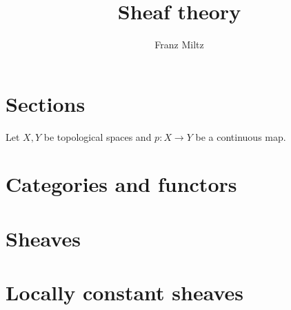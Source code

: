 \documentclass{article}
\author{Franz Miltz}
\title{Sheaf theory}
\begin{document}
\maketitle
\tableofcontents
\pagebreak

\printbibliography

\section{Sections}\label{sec:sections}

\begin{definition}
  Let $X,Y$ be topological spaces and $p:X\to Y$ be a continuous map.
\end{definition}

\missingexample

\section{Categories and functors}\label{sec:categories_and_functors}

\begin{definition}[Category]\label{def:category}
  \missingdef
\end{definition}

\begin{definition}[Functor]\label{def:functor}
  \missingdef
\end{definition}

\section{Sheaves}\label{sec:sheaves}

\begin{definition}[Presheaf]

\end{definition}

\begin{definition}[Sheaf]
  \missingdef
\end{definition}

\begin{definition}
  \missingdef
\end{definition}

\begin{definition}
  \missingdef
\end{definition}

\section{Locally constant sheaves}\label{sec:locally_constant_sheaves}
\end{document}
